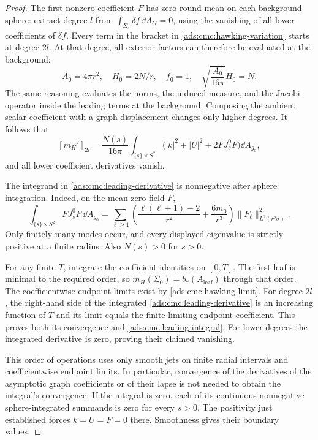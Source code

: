 \begin{proof}
The first nonzero coefficient \(F\) has zero round mean on each
background sphere: extract degree \(l\) from
\(\int_{\Sigma_s}\delta f\,\dd A_G=0\), using the vanishing of all
lower coefficients of \(\delta f\).
Every term in the bracket in \eqref{ads:cmc:hawking-variation} starts at
degree \(2l\).  At that degree, all exterior factors can therefore
be evaluated at the background:
\[
 A_0=4\pi r^2,\quad H_0=2N/r,\quad \bar f_0=1,
 \quad\sqrt{\frac{A_0}{16\pi}}H_0=N.
\]
The same reasoning evaluates the norms, the induced measure, and
the Jacobi operator inside the leading terms at the background.
Composing the ambient scalar coefficient with a graph displacement
changes only higher degrees.
It follows that
\begin{equation}\label{ads:cmc:leading-derivative}
 [m_H']_{2l}
 =\frac{N(s)}{16\pi}\int_{\{s\}\times S^2}
        \bigl(|k|^2+|U|^2+2FJ_s^0F\bigr)\dd A_{g_0},
\end{equation}
and all lower coefficient derivatives vanish.

The integrand in \eqref{ads:cmc:leading-derivative} is nonnegative after
sphere integration.  Indeed, on the mean-zero field \(F\),
\[
 \int_{\{s\}\times S^2}FJ_s^0F\,\dd A_{g_0}
 =\sum_{\ell\ge1}
  \left(\frac{\ell(\ell+1)-2}{r^2}+\frac{6m_0}{r^3}\right)
       \|F_\ell\|_{L^2(r^2\sigma)}^2.
\]
Only finitely many modes occur, and every displayed eigenvalue is
strictly positive at a finite radius.
Also \(N(s)>0\) for \(s>0\).

For any finite \(T\), integrate the coefficient identities on
\([0,T]\).
The first leaf is minimal to the required order, so
\(m_H(\Sigma_0)=b_*(A_{\mathrm{leaf}})\) through that order.
The coefficientwise endpoint limits exist by
\eqref{ads:cmc:hawking-limit}.
For degree \(2l\), the right-hand side of the integrated
\eqref{ads:cmc:leading-derivative} is an increasing function of \(T\)
and its limit equals the finite limiting endpoint coefficient.
This proves both its convergence and
\eqref{ads:cmc:leading-integral}.
For lower degrees the integrated derivative is zero, proving their
claimed vanishing.

This order of operations uses only smooth jets on finite radial
intervals and coefficientwise endpoint limits.
In particular, convergence of the derivatives of the asymptotic
graph coefficients or of their lapse is not needed to obtain the
integral's convergence.
If the integral is zero, each of its continuous nonnegative
sphere-integrated summands is zero for every \(s>0\).
The positivity just established forces \(k=U=F=0\) there.
Smoothness gives their boundary values.
\end{proof}
